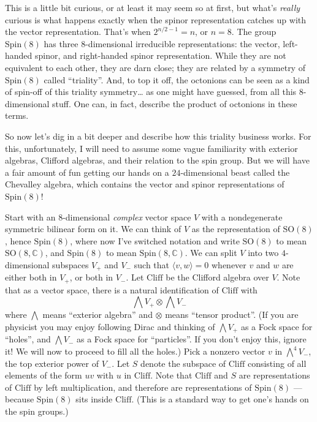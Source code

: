 \documentclass{article}
\begin{document}
This is a little bit curious, or at least it may seem so at first, but
what's \emph{really} curious is what happens exactly when the spinor
representation catches up with the vector representation. That's when
\(2^{n/2-1} = n\), or \(n = 8\). The group \(\mathrm{Spin}(8)\) has
three \(8\)-dimensional irreducible representations: the vector,
left-handed spinor, and right-handed spinor representation. While they
are not equivalent to each other, they are darn close; they are related
by a symmetry of \(\mathrm{Spin}(8)\) called ``triality''. And, to top
it off, the octonions can be seen as a kind of spin-off of this triality
symmetry\ldots{} as one might have guessed, from all this
\(8\)-dimensional stuff. One can, in fact, describe the product of
octonions in these terms.

So now let's dig in a bit deeper and describe how this triality business
works. For this, unfortunately, I will need to assume some vague
familiarity with exterior algebras, Clifford algebras, and their
relation to the spin group. But we will have a fair amount of fun
getting our hands on a \(24\)-dimensional beast called the Chevalley
algebra, which contains the vector and spinor representations of
\(\mathrm{Spin}(8)\)!

Start with an \(8\)-dimensional \emph{complex} vector space \(V\) with a
nondegenerate symmetric bilinear form on it. We can think of \(V\) as
the representation of \(\mathrm{SO}(8)\), hence \(\mathrm{Spin}(8)\),
where now I've switched notation and write \(\mathrm{SO}(8)\) to mean
\(\mathrm{SO}(8,\mathbb{C})\), and \(\mathrm{Spin}(8)\) to mean
\(\mathrm{Spin}(8,\mathbb{C})\). We can split \(V\) into two
\(4\)-dimensional subspaces \(V_+\) and \(V_-\) such that
\(\langle v,w\rangle = 0\) whenever \(v\) and \(w\) are either both in
\(V_+\), or both in \(V_-\). Let \(\mathrm{Cliff}\) be the Clifford
algebra over \(V\). Note that as a vector space, there is a natural
identification of \(\mathrm{Cliff}\) with
\[\bigwedge V_+ \otimes \bigwedge V_-\] where \(\bigwedge\) means
``exterior algebra'' and \(\otimes\) means ``tensor product''. (If you
are physicist you may enjoy following Dirac and thinking of
\(\bigwedge V_+\) as a Fock space for ``holes'', and \(\bigwedge V_-\)
as a Fock space for ``particles''. If you don't enjoy this, ignore it!
We will now to proceed to fill all the holes.) Pick a nonzero vector
\(v\) in \(\bigwedge^4 V_-\), the top exterior power of \(V_-\). Let
\(S\) denote the subspace of \(\mathrm{Cliff}\) consisting of all
elements of the form \(uv\) with \(u\) in \(\mathrm{Cliff}\). Note that
\(\mathrm{Cliff}\) and \(S\) are representations of \(\mathrm{Cliff}\)
by left multiplication, and therefore are representations of
\(\mathrm{Spin}(8)\) --- because \(\mathrm{Spin}(8)\) sits inside
\(\mathrm{Cliff}\). (This is a standard way to get one's hands on the
spin groups.)
\end{document}
